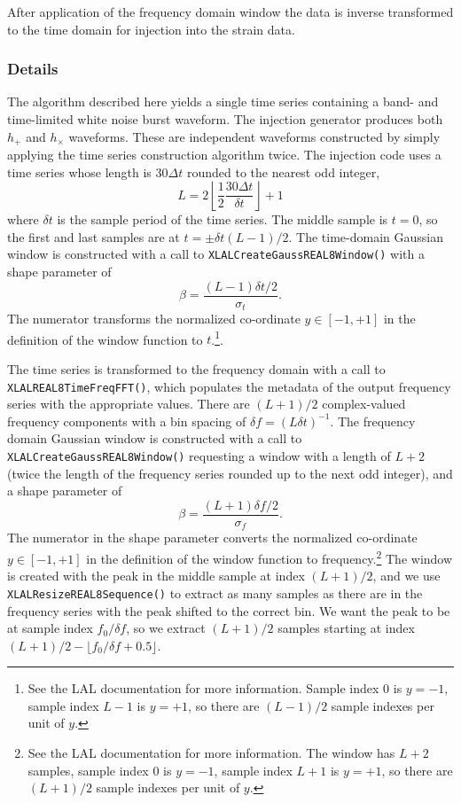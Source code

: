 \documentclass[10pt]{article}
\begin{document}
After application of the frequency domain window the data is inverse
transformed to the time domain for injection into the strain data.


\subsubsection{Details}


The algorithm described here yields a single time series containing a band-
and time-limited white noise burst waveform.  The injection generator
produces both \(h_{+}\) and \(h_{\times}\) waveforms.  These are
independent waveforms constructed by simply applying the time series
construction algorithm twice.  The injection code uses a time series whose
length is \(30 \Delta t\) rounded to the nearest odd integer,
\begin{equation}
L
   = 2 \left\lfloor \frac{1}{2} \frac{30 \Delta t}{\delta t} \right\rfloor
   + 1
\end{equation}
where \(\delta t\) is the sample period of the time series.  The middle
sample is \(t = 0\), so the first and last samples are at \(t = \pm \delta
t (L - 1) / 2\).  The time-domain Gaussian window is constructed with a
call to \texttt{XLALCreateGaussREAL8Window()} with a shape parameter of
\begin{equation}
\beta
   = \frac{(L - 1) \delta t / 2}{\sigma_{t}}.
\end{equation}
The numerator transforms the normalized co-ordinate \(y \in [-1, +1]\) in
the definition of the window function to \(t\).\footnote{See the LAL
documentation for more information.  Sample index 0 is \(y = -1\), sample
index \(L - 1\) is \(y = +1\), so there are \((L - 1) / 2\) sample indexes
per unit of \(y\).}.

The time series is transformed to the frequency domain with a call to
\texttt{XLALREAL8TimeFreqFFT()}, which populates the metadata of the output
frequency series with the appropriate values.  There are \((L + 1) / 2\)
complex-valued frequency components with a bin spacing of \(\delta f = (L
\delta t)^{-1}\).  The frequency domain Gaussian window is constructed with
a call to \texttt{XLALCreateGaussREAL8Window()} requesting a window with a
length of \(L + 2\) (twice the length of the frequency series rounded up to
the next odd integer), and a shape parameter of
\begin{equation}
\beta
   = \frac{(L + 1) \delta f / 2}{\sigma_{f}}.
\end{equation}
The numerator in the shape parameter converts the normalized co-ordinate
\(y \in [-1, +1]\) in the definition of the window function to
frequency.\footnote{See the LAL documentation for more information.  The
window has \(L + 2\) samples, sample index 0 is \(y = -1\), sample index
\(L + 1\) is \(y = +1\), so there are \((L + 1) / 2\) sample indexes per
unit of \(y\).}  The window is created with the peak in the middle sample
at index \((L + 1) / 2\), and we use \texttt{XLALResizeREAL8Sequence()} to
extract as many samples as there are in the frequency series with the peak
shifted to the correct bin.  We want the peak to be at sample index \(f_{0}
/ \delta f\), so we extract \((L + 1) / 2\) samples starting at index \((L
+ 1) / 2 - \lfloor f_{0} / \delta f + 0.5 \rfloor\).
\end{document}

